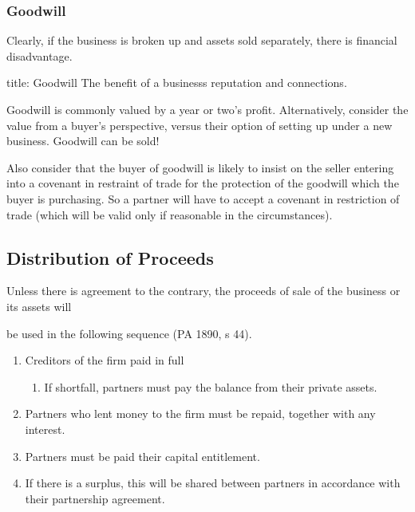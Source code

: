 \documentclass[
]{article}
\newenvironment{Shaded}{}{}
\newcommand{\NormalTok}[1]{#1}
\providecommand{\tightlist}{%
  \setlength{\itemsep}{0pt}\setlength{\parskip}{0pt}}
\begin{document}
\hypertarget{goodwill}{%
\subsubsection{Goodwill}\label{goodwill}}

Clearly, if the business is broken up and assets sold separately, there
is financial disadvantage.

\begin{Shaded}
\begin{Highlighting}[]
\NormalTok{title: Goodwill}
\NormalTok{The benefit of a business\textquotesingle{}s reputation and connections. }
\end{Highlighting}
\end{Shaded}

Goodwill is commonly valued by a year or two's profit. Alternatively,
consider the value from a buyer's perspective, versus their option of
setting up under a new business. Goodwill can be sold!

Also consider that the buyer of goodwill is likely to insist on the
seller entering into a covenant in restraint of trade for the protection
of the goodwill which the buyer is purchasing. So a partner will have to
accept a covenant in restriction of trade (which will be valid only if
reasonable in the circumstances).

\hypertarget{distribution-of-proceeds}{%
\subsection{Distribution of Proceeds}\label{distribution-of-proceeds}}

Unless there is agreement to the contrary, the proceeds of sale of the
business or its assets will

be used in the following sequence (PA 1890, s 44).

\begin{enumerate}
\def\labelenumi{\arabic{enumi}.}
\tightlist
\item
  Creditors of the firm paid in full

  \begin{enumerate}
  \def\labelenumii{\arabic{enumii}.}
  \tightlist
  \item
    If shortfall, partners must pay the balance from their private
    assets.
  \end{enumerate}
\item
  Partners who lent money to the firm must be repaid, together with any
  interest.
\item
  Partners must be paid their capital entitlement.
\item
  If there is a surplus, this will be shared between partners in
  accordance with their partnership agreement.
\end{enumerate}
\end{document}
